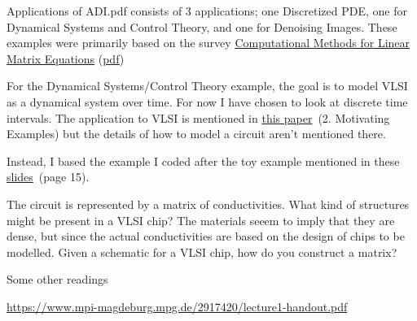 \documentclass[
]{article}
\date{}
\begin{document}
{Applications of ADI.pdf consists of 3 applications; one Discretized PDE, one for
Dynamical Systems and Control Theory, and one for Denoising Images.
These examples were primarily based on the survey
}{\href{https://www.google.com/url?q=https://epubs.siam.org/doi/10.1137/130912839\&sa=D\&ust=1575490230664000}{Computational
Methods for Linear Matrix Equations}} (\href{http://www.dm.unibo.it/~simoncin/matrixeq.pdf}{pdf})
{}

{For the Dynamical Systems/Control Theory example, the goal is to model
VLSI as a dynamical system over time. For now I have chosen to look at
discrete time intervals. The
application to VLSI is mentioned in
}{\href{https://www.google.com/url?q=http://matwbn.icm.edu.pl/ksiazki/amc/amc11/amc1155.pdf\&sa=D\&ust=1575490230665000}{this
paper}}{~(2. Motivating Examples) but the details of how to model a
circuit aren't mentioned there.} 


{Instead, I based the example I coded after the toy example mentioned in
these
}{\href{https://www.google.com/url?q=https://web.stanford.edu/class/archive/ee/ee263/ee263.1082/notes/ee263coursereader.pdf\&sa=D\&ust=1575490230665000}{slides}}{~(page
15)}{.}


{ \par}

The circuit is represented by a matrix of conductivities. What kind of structures might be present in a VLSI chip? The materials seeem to imply that they are dense, but since the actual conductivities are based on the design of chips to be modelled. Given a schematic for a VLSI chip, how do you construct a matrix?


{Some other readings}



{\href{https://www.google.com/url?q=https://www.mpi-magdeburg.mpg.de/2917420/lecture1-handout.pdf\&sa=D\&ust=1575490230666000}{https://www.mpi-magdeburg.mpg.de/2917420/lecture1-handout.pdf}}
\end{document}
